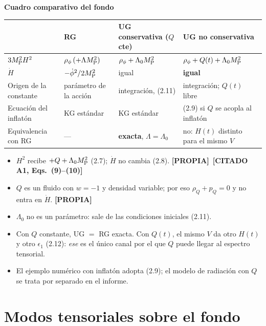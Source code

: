 \documentclass[11pt,a4paper]{article}
\newcommand{\MP}{M_{\rm P}}
\newcommand{\propia}{{\bfseries\color{TealBlue}[PROPIA]}}
\newcommand{\citado}[1]{{\bfseries\color{RoyalBlue}[CITADO #1]}}
\begin{document}
\medskip\noindent\textbf{Cuadro comparativo del fondo}
\begin{center}\small
\renewcommand{\arraystretch}{1.3}
\begin{tabular}{@{}L{3.5cm}L{3.1cm}L{3.5cm}L{4.9cm}@{}}
\toprule
& \textbf{RG} & \textbf{UG conservativa} ($Q$ cte) & \textbf{UG no conservativa}\\
\midrule
$3\MP^2H^2$ & $\rho_\phi\,(+\Lambda\MP^2)$ & $\rho_\phi+\Lambda_0\MP^2$ & $\rho_\phi+Q(t)+\Lambda_0\MP^2$\\
$\dot H$ & $-\dot\phi^2/2\MP^2$ & igual & \textbf{igual}\\
Origen de la constante & parámetro de la acción & integración, (2.11) & integración; $Q(t)$ libre\\
Ecuación del inflatón & KG estándar & KG estándar & (2.9) si $Q$ se acopla al inflatón\\
Equivalencia con RG & --- & \textbf{exacta}, $\Lambda=\Lambda_0$ & no: $H(t)$ distinto para el mismo $V$\\
\bottomrule
\end{tabular}
\end{center}

\begin{llevarse}
\begin{itemize}[nosep]
\item $H^2$ recibe $+Q+\Lambda_0\MP^2$ (2.7); $\dot H$ no cambia (2.8). \propia\ \citado{A1, Eqs.~(9)--(10)}
\item $Q$ es un fluido con $w=-1$ y densidad variable; por eso $\rho_Q+p_Q=0$ y no entra en $\dot H$. \propia
\item $\Lambda_0$ no es un parámetro: sale de las condiciones iniciales (2.11).
\item Con $Q$ constante, UG $=$ RG exacta. Con $Q(t)$, el mismo $V$ da otro $H(t)$ y otro $\epsilon_1$ (2.12): \emph{ese} es el único canal por el que $Q$ puede llegar al espectro tensorial.
\item El ejemplo numérico con inflatón adopta (2.9); el modelo de radiación con $Q$ se trata por separado en el informe.
\end{itemize}
\end{llevarse}

\section{Modos tensoriales sobre el fondo}
\end{document}
